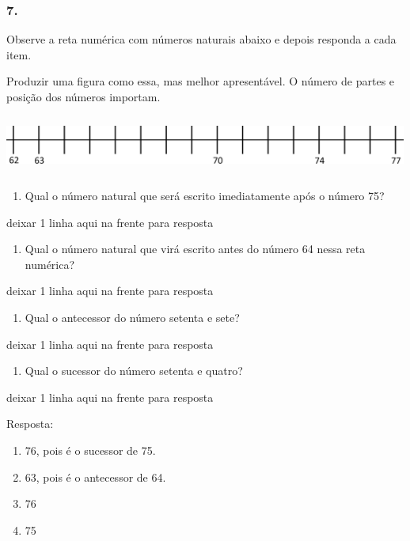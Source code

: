 \subsubsection{7.}\label{section-39}

Observe a reta numérica com números naturais abaixo e depois responda a
cada item.

Produzir uma figura como essa, mas melhor apresentável. O número de
partes e posição dos números importam.

\includegraphics[width=5.22545in,height=0.75840in]{media/image31.png}

\begin{enumerate}
\def\labelenumi{\alph{enumi})}
\item
  Qual o número natural que será escrito imediatamente após o número 75?
\end{enumerate}

deixar 1 linha aqui na frente para resposta

\begin{enumerate}
\def\labelenumi{\alph{enumi})}
\item
  Qual o número natural que virá escrito antes do número 64 nessa reta
  numérica?
\end{enumerate}

deixar 1 linha aqui na frente para resposta

\begin{enumerate}
\def\labelenumi{\alph{enumi})}
\item
  Qual o antecessor do número setenta e sete?
\end{enumerate}

deixar 1 linha aqui na frente para resposta

\begin{enumerate}
\def\labelenumi{\alph{enumi})}
\item
  Qual o sucessor do número setenta e quatro?
\end{enumerate}

deixar 1 linha aqui na frente para resposta

Resposta:

\begin{enumerate}
\def\labelenumi{\alph{enumi})}
\item
  76, pois é o sucessor de 75.
\item
  63, pois é o antecessor de 64.
\item
  76
\item
  75
\end{enumerate}

